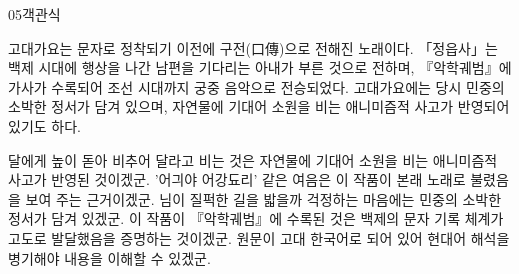 \documentclass[fs85,seriesWit]{korfarm-base}
\begin{document}
\begin{kfQBlock}{05}{객관식}
\begin{kfEvidence}고대가요는 문자로 정착되기 이전에 구전(口傳)으로 전해진 노래이다. 「정읍사」는 백제 시대에 행상을 나간 남편을 기다리는 아내가 부른 것으로 전하며, 『악학궤범』에 가사가 수록되어 조선 시대까지 궁중 음악으로 전승되었다. 고대가요에는 당시 민중의 소박한 정서가 담겨 있으며, 자연물에 기대어 소원을 비는 애니미즘적 사고가 반영되어 있기도 하다.\end{kfEvidence}
\begin{kfChoices}
\kfChoice 달에게 높이 돋아 비추어 달라고 비는 것은 자연물에 기대어 소원을 비는 애니미즘적 사고가 반영된 것이겠군.
\kfChoice '어긔야 어강됴리' 같은 여음은 이 작품이 본래 노래로 불렸음을 보여 주는 근거이겠군.
\kfChoice 님이 질퍽한 길을 밟을까 걱정하는 마음에는 민중의 소박한 정서가 담겨 있겠군.
\kfChoice 이 작품이 『악학궤범』에 수록된 것은 백제의 문자 기록 체계가 고도로 발달했음을 증명하는 것이겠군.
\kfChoice 원문이 고대 한국어로 되어 있어 현대어 해석을 병기해야 내용을 이해할 수 있겠군.
\end{kfChoices}
\end{kfQBlock}

\kfEndMC

\end{document}
